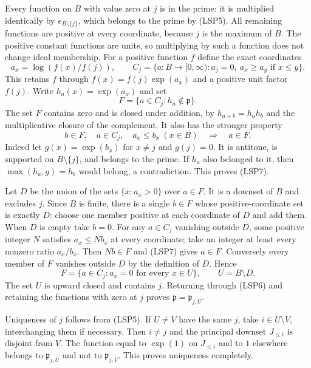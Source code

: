 Every function on $B$ with value zero at $j$ is in the prime:
it is multiplied identically by $e_{B\setminus\{j\}}$, which
belongs to the prime by (LSP5). All remaining functions are positive
at every coordinate, because $j$ is the maximum of $B$. The positive
constant functions are units, so multiplying by such a function
does not change ideal membership. For a positive function $f$ define
the exact coordinates
\begin{equation}\tag{LSP6}
 a_x=\log(f(x)/f(j)),\qquad
 C_j=\{a:B\to[0,\infty):a_j=0,\ a_x\ge a_y\text{ if }x\le y\}.
\end{equation}
This retains $f$ through $f(x)=f(j)\exp(a_x)$ and a positive
unit factor $f(j)$. Write $h_a(x)=\exp(a_x)$ and set
\[
 F=\{a\in C_j:h_a\notin\mathfrak p\}.
\]
The set $F$ contains zero and is closed under addition, by
$h_{a+b}=h_ah_b$ and the multiplicative closure of the complement.
It also has the stronger property
\begin{equation}\tag{LSP7}
 b\in F,\quad a\in C_j,\quad a_x\le b_x\ (x\in B)
 \quad\Longrightarrow\quad a\in F.
\end{equation}
Indeed let $g(x)=\exp(b_x)$ for $x\ne j$ and $g(j)=0$.
It is antitone, is supported on $B\setminus\{j\}$, and belongs
to the prime. If $h_a$ also belonged to it, then
$\max(h_a,g)=h_b$ would belong, a contradiction. This proves (LSP7).

Let $D$ be the union of the sets $\{x:a_x>0\}$ over $a\in F$.
It is a downset of $B$ and excludes $j$. Since $B$ is finite, there
is a single $b\in F$ whose positive-coordinate set is exactly $D$:
choose one member positive at each coordinate of $D$ and add them.
When $D$ is empty take $b=0$. For any $a\in C_j$ vanishing outside
$D$, some positive integer $N$ satisfies $a_x\le Nb_x$ at every
coordinate; take an integer at least every nonzero ratio $a_x/b_x$.
Then $Nb\in F$ and (LSP7) gives $a\in F$. Conversely every
member of $F$ vanishes outside $D$ by the definition of $D$. Hence
\begin{equation}\tag{LSP8}
 F=\{a\in C_j:a_x=0\text{ for every }x\in U\},
 \qquad U=B\setminus D.
\end{equation}
The set $U$ is upward closed and contains $j$. Returning through
(LSP6) and retaining the functions with zero at $j$ proves
$\mathfrak p=\mathfrak p_{j,U}$.

Uniqueness of $j$ follows from (LSP5). If $U\ne V$ have the same
$j$, take $i\in U\setminus V$, interchanging them if necessary.
Then $i\ne j$ and the principal downset $J_{\le i}$ is disjoint
from $V$. The function equal to $\exp(1)$ on $J_{\le i}$ and
to $1$ elsewhere belongs to $\mathfrak p_{j,U}$ and not to
$\mathfrak p_{j,V}$. This proves uniqueness completely.


